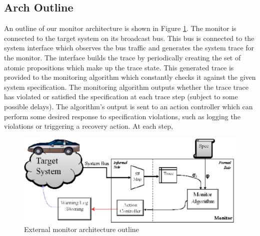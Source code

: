 \subsection{Arch Outline}
An outline of our monitor architecture is shown in Figure \ref{fig:architecture}. 
The monitor is connected to the target system on its broadcast bus. 
This bus is connected to the system interface which observes the bus traffic and generates the system trace for the monitor. The interface builds the trace by periodically creating the set of atomic propositions which make up the trace state. 
This generated trace is provided to the monitoring algorithm which constantly checks it against the given system specification. 
The monitoring algorithm outputs whether the trace trace has violated or satisfied the specification at each trace step (subject to some possible delays). 
The algorithm's output is sent to an action controller which can perform some desired response to specification violations, such as logging the violations or triggering a recovery action.
At each step, 


\begin{figure}
\includegraphics[width=4.5in]{img/mon_arch}
\caption{External monitor architecture outline \label{fig:architecture}}
\end{figure}

